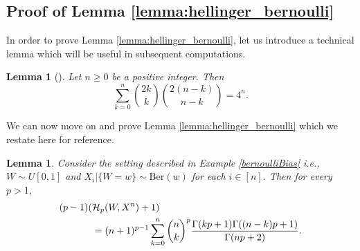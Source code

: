 \documentclass[conference]{IEEEtran}
\theoremstyle{plain}
\newtheorem{lemma}{Lemma}
\newtheorem*{lemma*}{Lemma}
\theoremstyle{definition}
\theoremstyle{remark}
\begin{document}
\subsection{Proof of Lemma \ref{lemma:hellinger_bernoulli}}\label{appendix:proof_lemma_hellinger_bernoulli}
In order to prove Lemma \ref{lemma:hellinger_bernoulli}, let us introduce a technical lemma which will be useful in subsequent computations.
\begin{lemma}[\!\!]\label{lemma:combinatorial_sum}
Let $n \geq 0$ be a positive integer. Then
\begin{equation}
    \sum_{k=0}^n \binom{2k}{k}\binom{2(n-k)}{n-k} = 4^n.
\end{equation}
\end{lemma}
We can now move on and prove Lemma \ref{lemma:hellinger_bernoulli} which we restate here for reference.
\begin{lemma*}
Consider the setting described in Example \ref{bernoulliBias} \textit{i.e.}, $W \sim U[0,1]$ and  $X_i|\{W\!=\!w\} \sim \text{Ber}(w)$ for each $i\in[n]$. Then for every $p>1$,
\begin{align}
    (p-1)(&\mathcal{H}_p(W,X^n)+1) \notag \\&= (n+1)^{p-1}\sum_{k=0}^n \binom{n}{k}^p\frac{\Gamma(kp+1)\Gamma((n-k)p+1)}{\Gamma(np+2)}.\notag
\end{align}
\end{lemma*}
\end{document}
